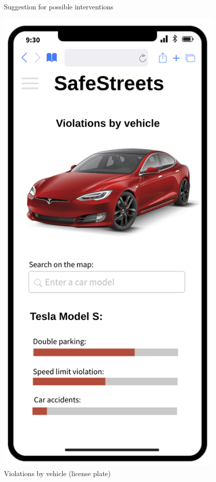 \begin{figure}[H]
\begin{minipage}[b]{0.40\textwidth}
		\caption{Suggestion for possible interventions}
	\end{minipage}
	\hfill
	\begin{minipage}[b]{0.40\textwidth}
		\includegraphics[width=\textwidth]{Images/dd-mocks/vehicle.png}
		\caption{Violations by vehicle (license plate)}
	\end{minipage}
\end{figure}

